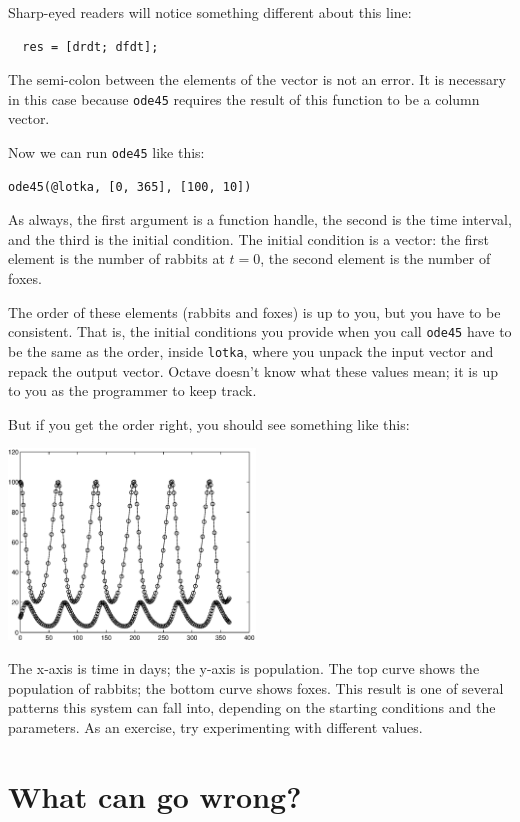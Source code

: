 Sharp-eyed readers will notice something different about this line:

\begin{verbatim}
  res = [drdt; dfdt];
\end{verbatim}

The semi-colon between the elements of the vector is not an error. It
is necessary in this case because {\tt ode45} requires the result of
this function to be a column vector.

Now we can run {\tt ode45} like this:

\begin{verbatim}
ode45(@lotka, [0, 365], [100, 10])
\end{verbatim}

As always, the first argument is a function handle, the second is the
time interval, and the third is the initial condition. The initial
condition is a vector: the first element is the number of rabbits at
$t=0$, the second element is the number of foxes.

The order of these elements (rabbits and foxes) is up to you, but
you have to be consistent. That is, the initial conditions you
provide when you call {\tt ode45} have to be the same as the order,
inside {\tt lotka}, where you unpack the input vector and repack
the output vector. Octave doesn't know what these values mean;
it is up to you as the programmer to keep track.

But if you get the order right, you should see something like this:

\beforefig \centerline{\includegraphics[height=2in]{figs/lotka.eps}}

The x-axis is time in days; the y-axis is population. The top
curve shows the population of rabbits; the bottom curve shows
foxes. This result is one of several patterns
this system can fall into, depending on the starting conditions
and the parameters. As an exercise, try experimenting with
different values.


\section{What can go wrong?}

